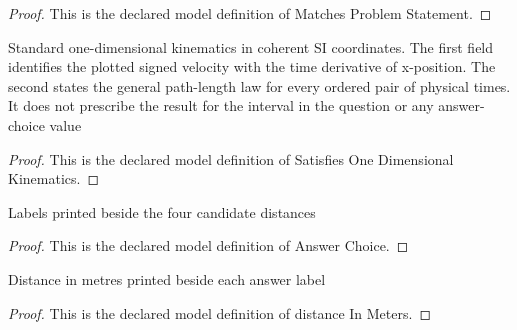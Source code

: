 \begin{proof}
  This is the declared model definition of Matches Problem Statement.
\end{proof}
\begin{definition}
  \label{def:physics:phyx-mini-0672:phyxminiproblems-problemphyxmini0672-satisfiesonedimensionalkinematics}
  Standard one-dimensional kinematics in coherent SI coordinates. The first field identifies the plotted signed velocity with the time derivative of x-position. The second states the general path-length law for every ordered pair of physical times. It does not prescribe the result for the interval in the question or any answer-choice value
\end{definition}
\begin{proof}
  This is the declared model definition of Satisfies One Dimensional Kinematics.
\end{proof}
\begin{definition}
  \label{def:physics:phyx-mini-0672:phyxminiproblems-problemphyxmini0672-answerchoice}
  Labels printed beside the four candidate distances
\end{definition}
\begin{proof}
  This is the declared model definition of Answer Choice.
\end{proof}
\begin{definition}
  \label{def:physics:phyx-mini-0672:phyxminiproblems-problemphyxmini0672-answerchoice-distanceinmeters}
  Distance in metres printed beside each answer label
\end{definition}
\begin{proof}
  This is the declared model definition of distance In Meters.
\end{proof}
